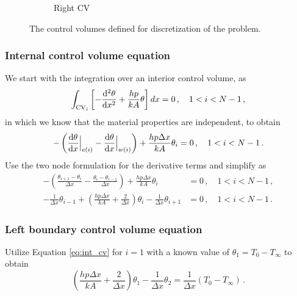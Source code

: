 \documentclass{article}
\begin{document}
\begin{figure}[H]
\begin{subfigure}[t]{0.3\textwidth}
		\caption{Right CV}
	\end{subfigure}
	\caption{The control volumes defined for discretization of the problem.}
	\label{fig:CVs}
\end{figure}

\subsubsection*{Internal control volume equation}

We start with the integration over an interior control volume, as
\[
	\int_{\text{CV}_i} \left[ -\dv{^2\theta}{x^2} + \frac{hp}{kA} \theta \right] dx = 0\,, \quad 1 < i < N - 1\,,
\]
in which we know that the material properties are independent, to obtain
\[
	- \left( \dv{\theta}{x}\Big|_{e(i)} - \dv{\theta}{x}\Big|_{w(i)} \right) + \frac{hp\Delta x}{kA} \theta_i = 0\,, \quad 1 < i < N - 1\,.
\]
Use the two node formulation for the derivative terms and simplify as
\begin{align}
	- \left( \frac{\theta_{i+1} - \theta_i}{\Delta x} - \frac{\theta_i - \theta_{i - 1}}{\Delta x} \right) + \frac{hp\Delta x}{kA} \theta_i & = 0 \,, \quad 1 < i < N - 1\,,\nonumber \\
	- \frac{1}{\Delta x} \theta_{i-1} + \left(\frac{h p \Delta x}{kA} + \frac{2}{\Delta x}\right) \theta_i - \frac{1}{\Delta x} \theta_{i+1} & = 0\,, \quad 1 < i < N - 1\,.
	\label{eq:int_cv}
\end{align}

\subsubsection*{Left boundary control volume equation}

Utilize Equation \ref{eq:int_cv} for $i = 1$ with a known value of $\theta_1 = T_0 - T_\infty$ to obtain
\begin{equation}
	\left(\frac{h p \Delta x}{kA} + \frac{2}{\Delta x}\right) \theta_1 - \frac{1}{\Delta x} \theta_2 = \frac{1}{\Delta x} (T_0 - T_\infty)\,.
	\label{eq:int_leftcv}
\end{equation}
\end{document}
